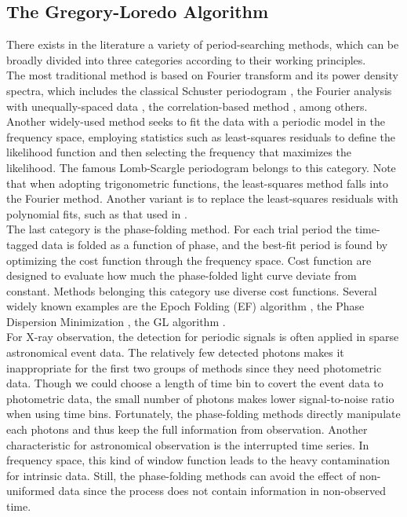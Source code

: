 \documentclass[twoside,twocolumn]{aastex63}
\begin{document}
\subsection{The Gregory-Loredo Algorithm} \label{subsec:GL}
There exists in the literature a variety of period-searching methods, which can be broadly divided into three categories according to their working principles. 
\\
\indent
The most traditional method is based on Fourier transform and its power density spectra, which includes the classical Schuster periodogram \citep{1898TeMag...3...13S}, the Fourier analysis with unequally-spaced data \citep{1975Ap&SS..36..137D}, the correlation-based method \citep{1988ApJ...333..646E}, among others.
\\
\indent
Another widely-used method seeks to fit the data with a periodic model in the frequency space, employing statistics such as least-squares residuals to define the likelihood function and then selecting the frequency that maximizes the likelihood. The famous Lomb-Scargle periodogram \citep[hereafter LS]{1976Ap&SS..39..447L,1982ApJ...263..835S} belongs to this category. Note that when adopting trigonometric functions, the least-squares method falls into the Fourier method. Another variant is to replace the least-squares residuals with polynomial fits, such as that used in \citet{1996ApJ...460L.107S}.
\\
\indent
The last category is the phase-folding method. For each trial period the time-tagged data is folded as a function of phase, and the best-fit period is found by optimizing the cost function through the frequency space. Cost function are designed  to evaluate how much the phase-folded light curve deviate from constant.
Methods belonging this category use diverse cost functions. Several widely known examples are the Epoch Folding (EF) algorithm \citep{1983ApJ...266..160L}, the Phase Dispersion Minimization \citep{1978ApJ...224..953S}, the GL algorithm \citep{1992ApJ...398..146G}.
\\
\indent
For X-ray observation, the detection for periodic signals is often applied in sparse astronomical event data. The relatively few detected photons makes it inappropriate for the first two groups of methods since they need photometric data. Though we could choose a length of time bin to covert the event data to photometric data, the small number of  photons makes lower signal-to-noise ratio when using time bins. Fortunately, the phase-folding methods directly manipulate each photons and thus keep the full information from observation. Another characteristic for astronomical observation is the interrupted time series. In frequency space, this kind of window function leads to the heavy contamination for intrinsic data. Still, the phase-folding methods can avoid the effect of non-uniformed data since the process does not contain information in non-observed time. 
\end{document}
